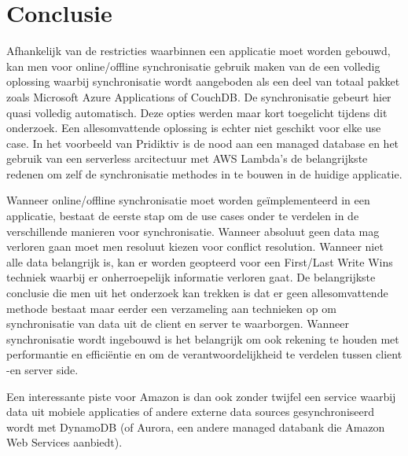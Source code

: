 
\chapter{Conclusie}
\label{ch:conclusie}


Afhankelijk van de restricties waarbinnen een applicatie moet worden gebouwd, kan men voor online/offline synchronisatie gebruik maken van de een volledig oplossing waarbij synchronisatie wordt aangeboden als een deel van totaal pakket zoals Microsoft Azure Applications of CouchDB. De synchronisatie gebeurt hier quasi volledig automatisch. Deze opties werden maar kort toegelicht tijdens dit onderzoek. Een allesomvattende oplossing is echter niet geschikt voor elke use case. In het voorbeeld van Pridiktiv is de nood aan een managed database en het gebruik van een serverless arcitectuur met AWS Lambda's de belangrijkste redenen om zelf de synchronisatie methodes in te bouwen in de huidige applicatie.

Wanneer online/offline synchronisatie moet worden ge\"implementeerd in een applicatie,  bestaat de eerste stap om de use cases onder te verdelen in de verschillende manieren voor synchronisatie. Wanneer absoluut geen data mag verloren gaan moet men resoluut kiezen voor conflict resolution. Wanneer niet alle data belangrijk is, kan er worden geopteerd voor een First/Last Write Wins techniek waarbij er onherroepelijk informatie verloren gaat. De belangrijkste conclusie die men uit het onderzoek kan trekken is dat er geen allesomvattende methode bestaat maar eerder een verzameling aan technieken op om synchronisatie van data uit de client en server te waarborgen. Wanneer synchronisatie wordt ingebouwd is het belangrijk om ook rekening te houden met performantie en effici\"entie en om de verantwoordelijkheid te verdelen tussen client -en server side.

Een interessante piste voor Amazon is dan ook zonder twijfel een service waarbij data uit mobiele applicaties of andere externe data sources gesynchroniseerd wordt met DynamoDB (of Aurora, een andere managed databank die Amazon Web Services aanbiedt).